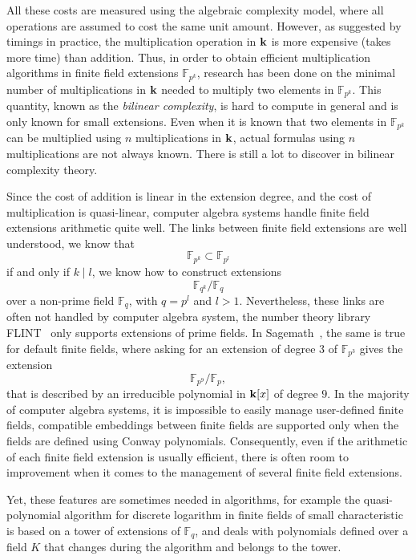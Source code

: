 All these costs are measured using the algebraic complexity model, where all operations
are assumed to cost the same unit amount. However, as suggested by timings in
practice, the multiplication operation in $\mathbf{k}$
is more expensive (\ie takes more time) than addition. Thus, in order to obtain
efficient multiplication algorithms in finite field extensions
$\mathbb{F}_{p^{k}}$, research has been done on the minimal number of
multiplications in $\mathbf{k}$ needed to multiply two elements in
$\mathbb{F}_{p^{k}}$. This quantity, known as the \emph{bilinear complexity}, is
hard to compute in general and is only known for small extensions. Even when it
is known that two elements in $\mathbb{F}_{p^{k}}$ can be multiplied using $n$
multiplications in $\mathbf{k}$, actual formulas using $n$ multiplications are not
always known. There is still a lot to discover in bilinear complexity theory.

Since the cost of addition is linear in the extension degree, and the cost of
multiplication is quasi-linear, computer algebra systems handle finite field
extensions arithmetic quite well. The links between finite
field extensions are well understood, \eg we know that
\[
  \mathbb{F}_{p^{k}}\subset\mathbb{F}_{p^{l}}
\]
if and only if $k\mid l$, we know how to construct extensions
\[
  \mathbb{F}_{q^k}/\mathbb{F}_{q}
\]
over a non-prime field $\mathbb{F}_{q}$, with $q=p^l$ and $l>1$. Nevertheless,
these links are often not handled by computer algebra system, \eg the number
theory library FLINT~\cite{Flint} only supports extensions of prime fields. In
Sagemath~\cite{Sagemath}, the same is true for default finite fields, where
asking for an extension of degree $3$ of $\mathbb{F}_{p^{3}}$ gives the
extension
\[
  \mathbb{F}_{p^{9}}/\mathbb{F}_p,
\]
that is described by an irreducible polynomial in $\mathbf{k}[x]$ of degree $9$.
In the majority of computer algebra systems, it is
impossible to easily manage user-defined finite fields, \ie compatible
embeddings between finite fields are supported only when the fields are defined
using Conway polynomials. Consequently, even if the arithmetic of each finite
field extension is usually efficient, there is often room to improvement when it
comes to the management of several finite field extensions.

Yet, these features are sometimes needed in algorithms, for example the
quasi-polynomial algorithm for discrete logarithm in finite fields of small
characteristic~\cite{GKZ14} is based on a tower of extensions of $\mathbb{F}_q$,
and deals with polynomials defined over a field $K$ that changes during the
algorithm and belongs to the tower.


